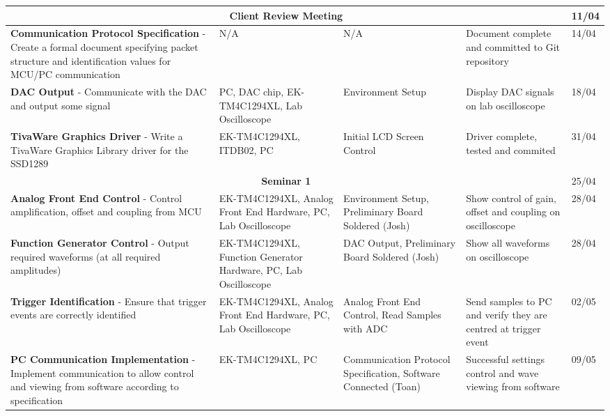 \documentclass[12pt]{report}
\begin{document}
\begin{longtable}{|p{5cm}|p{4cm}|p{2.8cm}|p{2.5cm}|p{1.8cm}|}
	\hline
	\multicolumn{4}{|c|}{\textbf{Client Review Meeting}} & 11/04\\	
	
	\hline
	\textbf{Communication Protocol Specification} - Create a formal document specifying packet structure and identification values for MCU/PC communication &
	N/A &
	N/A &
	Document complete and committed to Git repository &
	14/04\\
	
	\hline
	\textbf{DAC Output} - Communicate with the DAC and output some signal &
	PC, DAC chip, \mbox{EK-TM4C1294XL}, Lab Oscilloscope &
	Environment Setup &
	Display DAC signals on lab oscilloscope &
	18/04\\
		
	\hline
	\textbf{TivaWare Graphics Driver} - Write a TivaWare Graphics Library driver for the SSD1289 &
	EK-TM4C1294XL, ITDB02, PC &
	Initial LCD Screen Control &
	Driver complete, tested and commited &
	31/04\\
	
	\hline
	\multicolumn{4}{|c|}{\textbf{Seminar 1}} & 25/04\\	
	
	\hline
	\textbf{Analog Front End Control} - Control amplification, offset and coupling from MCU &
	EK-TM4C1294XL, Analog Front End Hardware, PC, Lab Oscilloscope &
	Environment Setup, Preliminary Board Soldered (Josh) &
	Show control of gain, offset and coupling on oscilloscope &
	28/04\\
			
	\hline
	\textbf{Function Generator Control} - Output required waveforms (at all required amplitudes) &
	EK-TM4C1294XL, Function Generator Hardware, PC, Lab Oscilloscope &
	DAC Output, Preliminary Board Soldered (Josh) &
	Show all waveforms on oscilloscope &
	28/04\\
	
	\hline
	\textbf{Trigger Identification} - Ensure that trigger events are correctly identified &
	EK-TM4C1294XL, Analog Front End Hardware, PC, Lab Oscilloscope &
	Analog Front End Control, Read Samples with ADC &
	Send samples to PC and verify they are centred at trigger event &
	02/05\\
	
	\hline
	\textbf{PC Communication Implementation} - Implement communication to allow control and viewing from software according to specification &
	EK-TM4C1294XL, PC &
	Communication Protocol Specification, Software Connected (Toan) &
	Successful settings \hbox{control} and wave viewing from software &
	09/05\\
	

\end{longtable}
\end{document}

